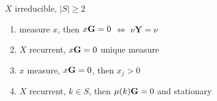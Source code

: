 \begin{lemma}
    $X$ irreducible, $|S|\geq 2$
    \begin{enumerate}
        \item measure $x$, then $x \textbf{G} = 0$ $\iff$ $\nu \textbf{Y}= \nu$
        \item $X$ recurrent, $x \textbf{G} = 0$ unique measure
        \item $x$ measure, $x \textbf{G} = 0$, then $x_j > 0$
        \item $X$ recurrent, $k \in S$, then $\mu(k) \textbf{G} = 0$ and stationary
    \end{enumerate}
\end{lemma}


